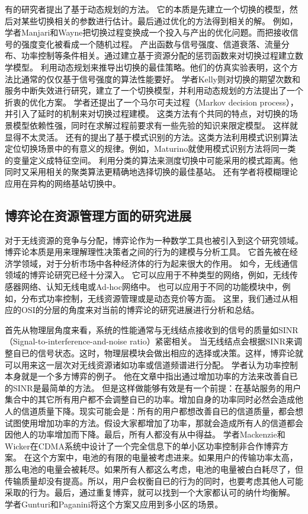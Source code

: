 有的研究者提出了基于动态规划的方法。
它的本质是先建立一个切换的模型，然后对某些切换相关的参数进行估计。最后通过优化的方法得到相关的解。
例如，学者Manjari和Wayne把切换过程变换成一个投入与产出的优化问题。而把接收信号的强度变化被看成一个随机过程\cite{513159}。
产出函数与信号强度、信道衰落、流量分布、功率控制等条件相关。通过建立基于资源分配的惩罚函数来对切换过程建立数学模型。
利用动态规划来推导出切换的最佳策略。他们的仿真实验表明，这个方法比通常的仅仅基于信号强度的算法性能要好。
学者Kelly则对切换的期望次数和服务中断失效进行研究，建立了一个切换模型，并利用动态规划的方法提出了一个折衷的优化方案\cite{618185}。
学者还提出了一个马尔可夫过程（Markov decision process），并引入了延时的机制来对切换过程建模\cite{504996}。
这类方法有个共同的特点，对切换的场景模型依赖性强，同时在求解过程前要求有一些先验的知识来限定模型。
这样就显得不太灵活。
还有的提出了基于模式识别的方法。这类方法利用模式识别算法定位切换场景中的有意义的规律。例如，Maturino就使用模式识别方法将同一类的变量定义成特征空间\cite{345157}。
利用分类的算法来测度切换中可能采用的模式距离。他同时又采用相关的聚类算法更精确地选择切换的最佳基站。
还有学者将模糊理论应用在异构的网络基站切换中\cite{5189770}\cite{5672711}。
\subsection{博弈论在资源管理方面的研究进展}
对于无线资源的竞争与分配，博弈论作为一种数学工具也被引入到这个研究领域。博弈论本质是用来理解理性决策者之间的行为的建模与分析工具。
它首先被在经济学领域，对于分析市场中各种经济体的行为起来很大的作用。
如今，无线通信领域的博弈论研究已经十分深入。
它可以应用于不种类型的网络，例如，无线传感器网络、认知无线电或Ad-hoc网络中\cite{MachadoTekinay:2008}\cite{WangWu:2010}\cite{Srivastava:2005}。
也可以应用于不同的功能模块中，例如，分布式功率控制，无线资源管理或是动态竞价等方面\cite{AlpcanBasar:2006}\cite{Senqupta:2009}。
这里，我们通过从相应的OSI的分层的角度来对当前的博弈论的研究进展进行分析和总结。

首先从物理层角度来看，系统的性能通常与无线结点接收到的信号的质量如SINR（Signal-to-interference-and-noise ratio）紧密相关。
当无线结点会根据SINR来调整自已的信号状态。这时，物理层模块会做出相应的选择或决策。这样，博弈论就可以用来这一层次对无线资源诸如功率或信道频谱进行分配。
学者认为功率控制本身就是一个多方博弈的例子\cite{GoodmanMandayam:2000}。
他在文章中指出通过增加功率的方法来改善自已的SINR是最简单的方法。
但是这样做能够有效是有一个前提：在基站服务的用户集合中的其它所有用户都不会调整自已的功率。增加自身的功率同时必然会造成他人的信道质量下降。现实可能会是：所有的用户都想改善自已的信道质量，都会想试图使用增加功率的方法。假设大家都增加了功率，那就会造成所有人的信道都会因他人的功率增加而下降。最后，所有人都没有从中得益。
学者Mackenzie和Wicker在CDMA系统中设计了一个完全信息下的单小区功率控制非合作博弈方案\cite{MackenzieWiker:2001}。
在这个方案中，电池的有限的电量被考虑进来。如果用户的传输功率太高，那么电池的电量会被耗尽。如果所有人都这么考虑，电池的电量被白白耗尽了，但传输质量却没有提高。所以，用户会权衡自已的行为的同时，也要考虑其他人可能采取的行为。最后，通过重复博弈，就可以找到一个大家都认可的纳什均衡解。
学者Gunturi和Paganini将这个方案又应用到多小区的场景\cite{GunturiPaganini:2003}。


